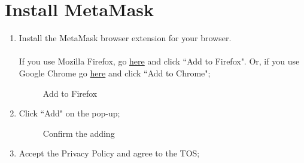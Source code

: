 \documentclass[ManualeUtente]{subfiles}
\begin{document}
\section{Install MetaMask}
\begin{enumerate}
	\item Install the MetaMask browser extension for your browser.\\\\
	If you use Mozilla Firefox, go
	\href{https://addons.mozilla.org/en-US/firefox/addon/ether-metamask/}{here}
	and click \textquotedblleft Add to Firefox". Or, if you use Google Chrome go \href{https://chrome.google.com/webstore/detail/metamask/nkbihfbeogaeaoehlefnkodbefgpgknn}{here} and click \textquotedblleft Add to Chrome";
	\begin{figure}[H]
		\centering
		\caption{Add to Firefox}
		\label{fig:Add to Firefox}
	\end{figure}
	\item Click \textquotedblleft Add" on the pop-up;
	\begin{figure}[H]
		\centering
		\caption{Confirm the adding}
		\label{fig:Confirm the adding}
	\end{figure}
	\item Accept the Privacy Policy and agree to the TOS;
\end{enumerate}
\end{document}
